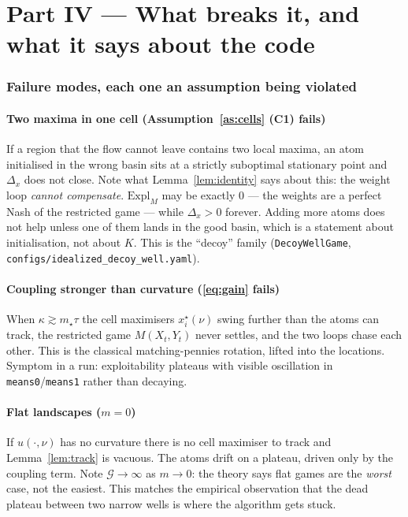 \documentclass[11pt,a4paper]{article}
\theoremstyle{plain}
\theoremstyle{definition}
\theoremstyle{remark}
\newcommand{\Expl}{\mathrm{Expl}}
\begin{document}
\newpage
\part*{Part IV --- What breaks it, and what it says about the code}

\section{Failure modes, each one an assumption being violated}

\subsection{Two maxima in one cell (Assumption~\ref{as:cells} (C1) fails)}
If a region that the flow cannot leave contains two local maxima, an atom
initialised in the wrong basin sits at a strictly suboptimal stationary point and
$\Delta_x$ does not close. Note what Lemma~\ref{lem:identity} says about this: the
weight loop \emph{cannot compensate}. $\Expl_M$ may be exactly $0$ --- the weights
are a perfect Nash of the restricted game --- while $\Delta_x>0$ forever. Adding
more atoms does not help unless one of them lands in the good basin, which is a
statement about initialisation, not about $K$. This is the ``decoy'' family
(\texttt{DecoyWellGame}, \texttt{configs/idealized\_decoy\_well.yaml}).

\subsection{Coupling stronger than curvature (\eqref{eq:gain} fails)}
When $\kappa \gtrsim m_\star\tau$ the cell maximisers $x_i^\star(\nu)$ swing further
than the atoms can track, the restricted game $M(X_t,Y_t)$ never settles, and the
two loops chase each other. This is the classical matching-pennies rotation, lifted
into the locations. Symptom in a run: exploitability plateaus with visible
oscillation in \texttt{means0}/\texttt{means1} rather than decaying.

\subsection{Flat landscapes ($m=0$)}
If $u(\cdot,\nu)$ has no curvature there is no cell maximiser to track and
Lemma~\ref{lem:track} is vacuous. The atoms drift on a plateau, driven only by the
coupling term. Note $\mathcal G\to\infty$ as $m\to0$: the theory says flat games are
the \emph{worst} case, not the easiest. This matches the empirical observation that
the dead plateau between two narrow wells is where the algorithm gets stuck.
\end{document}
